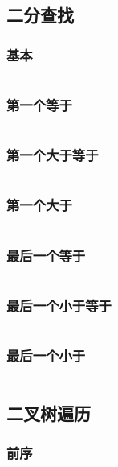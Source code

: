 \documentclass[a4paper,11pt]{article}
\begin{document}
\newpage
\subsection{二分查找}

\subsubsection{基本}
\inputminted[linenos,autogobble]{java}{basic/binary-search/basis.java}

\subsubsection{第一个等于}
\inputminted[linenos,autogobble]{java}{basic/binary-search/first-eq.java}

\subsubsection{第一个大于等于}
\inputminted[linenos,autogobble]{java}{basic/binary-search/first-geq.java}

\subsubsection{第一个大于}
\inputminted[linenos,autogobble]{java}{basic/binary-search/first-g.java}

\subsubsection{最后一个等于}
\inputminted[linenos,autogobble]{java}{basic/binary-search/last-eq.java}

\subsubsection{最后一个小于等于}
\inputminted[linenos,autogobble]{java}{basic/binary-search/last-leq.java}

\subsubsection{最后一个小于}
\inputminted[linenos,autogobble]{java}{basic/binary-search/last-l.java}

\newpage
\subsection{二叉树遍历}

\subsubsection{前序}
\inputminted[linenos,autogobble]{java}{basic/tree/pre-order.java}
\end{document}
